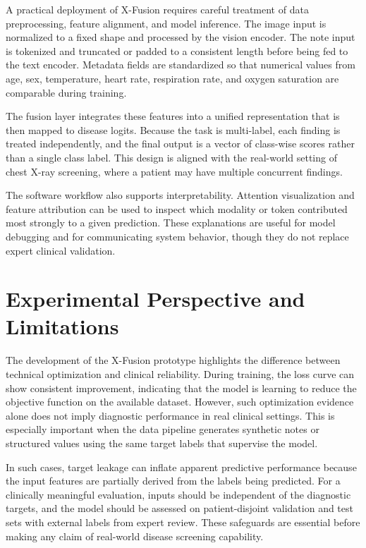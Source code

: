 \documentclass[conference,a4paper]{IEEEtran}
\begin{document}
A practical deployment of X-Fusion requires careful treatment of data preprocessing, feature alignment, and model inference. The image input is normalized to a fixed shape and processed by the vision encoder. The note input is tokenized and truncated or padded to a consistent length before being fed to the text encoder. Metadata fields are standardized so that numerical values from age, sex, temperature, heart rate, respiration rate, and oxygen saturation are comparable during training.

The fusion layer integrates these features into a unified representation that is then mapped to disease logits. Because the task is multi-label, each finding is treated independently, and the final output is a vector of class-wise scores rather than a single class label. This design is aligned with the real-world setting of chest X-ray screening, where a patient may have multiple concurrent findings.

The software workflow also supports interpretability. Attention visualization and feature attribution can be used to inspect which modality or token contributed most strongly to a given prediction. These explanations are useful for model debugging and for communicating system behavior, though they do not replace expert clinical validation.

\section{Experimental Perspective and Limitations}

The development of the X-Fusion prototype highlights the difference between technical optimization and clinical reliability. During training, the loss curve can show consistent improvement, indicating that the model is learning to reduce the objective function on the available dataset. However, such optimization evidence alone does not imply diagnostic performance in real clinical settings. This is especially important when the data pipeline generates synthetic notes or structured values using the same target labels that supervise the model.

In such cases, target leakage can inflate apparent predictive performance because the input features are partially derived from the labels being predicted. For a clinically meaningful evaluation, inputs should be independent of the diagnostic targets, and the model should be assessed on patient-disjoint validation and test sets with external labels from expert review. These safeguards are essential before making any claim of real-world disease screening capability.
\end{document}
